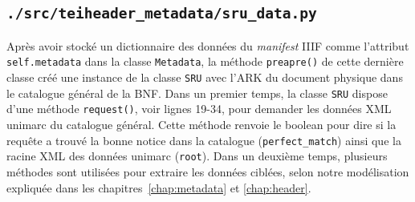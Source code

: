 \documentclass[class=article, crop=false]{standalone}
\begin{document}
\subsection{\texttt{./src/teiheader\_metadata/sru\_data.py}}
Après avoir stocké un dictionnaire des données du \textit{manifest} \acrshort{IIIF} comme l'attribut \texttt{self.metadata} dans la classe \texttt{Metadata}, la méthode \texttt{preapre()} de cette dernière classe créé une instance de la classe \texttt{SRU} avec l'\acrshort{ARK} du document physique dans le catalogue général de la \acrshort{BNF}. Dans un premier temps, la classe \texttt{SRU} dispose d'une méthode \texttt{request()}, voir lignes 19-34, pour demander les données \acrshort{XML} \Gls{unimarc} du catalogue général. Cette méthode renvoie le boolean pour dire si la requête a trouvé la bonne notice dans la catalogue (\texttt{perfect\_match}) ainsi que la racine \acrshort{XML} des données \Gls{unimarc} (\texttt{root}). Dans un deuxième temps, plusieurs méthodes sont utilisées pour extraire les données ciblées, selon notre modélisation expliquée dans les chapitres~\ref{chap:metadata} et \ref{chap:header}.
\end{document}
